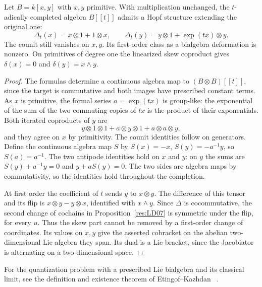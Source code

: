 \begin{theorem}
\label{res:LD08}
Let \(B=k[x,y]\) with \(x,y\) primitive. With multiplication
unchanged, the \(t\)-adically completed algebra \(B[[t]]\)
admits a Hopf structure extending the original one:
\[
 \Delta_t(x)=x\otimes1+1\otimes x,\qquad
 \Delta_t(y)=y\otimes1+\exp(tx)\otimes y .
\]
The counit still vanishes on \(x,y\). Its first-order class
as a bialgebra deformation is nonzero. On primitives of
degree one the linearized skew coproduct gives
\(\delta(x)=0\) and \(\delta(y)=x\wedge y\).
\end{theorem}
\begin{proof}
The formulas determine a continuous algebra map to
\((B\otimes B)[[t]]\), since the target is commutative and
both images have prescribed constant terms. As \(x\) is
primitive, the formal series \(a=\exp(tx)\) is group-like:
the exponential of the sum of the two commuting copies of
\(tx\) is the product of their exponentials.
Both iterated coproducts of \(y\) are
\[
 y\otimes1\otimes1+a\otimes y\otimes1+a\otimes a\otimes y,
\]
and they agree on \(x\) by primitivity. The counit
identities follow on generators. Define the continuous algebra
map \(S\) by \(S(x)=-x\), \(S(y)=-a^{-1}y\), so \(S(a)=a^{-1}\).
The two antipode identities hold on \(x\) and \(y\):
on \(y\) the sums are \(S(y)+a^{-1}y=0\) and
\(y+aS(y)=0\). The two sides are algebra maps by commutativity,
so the identities hold throughout the completion.

At first order the coefficient of \(t\) sends \(y\) to
\(x\otimes y\). The difference of this tensor and its flip
is \(x\otimes y-y\otimes x\), identified with \(x\wedge y\).
Since
\(\Delta\) is cocommutative, the second change of cochains
in Proposition~\ref{res:LD07} is symmetric under the flip,
for every \(u\). Thus the skew part cannot be removed by
a first-order change of coordinates. Its values on \(x,y\)
give the asserted cobracket on the abelian two-dimensional
Lie algebra they span. Its dual is a Lie bracket, since the
Jacobiator is alternating on a two-dimensional space.
\end{proof}

For the quantization problem with a prescribed Lie bialgebra
and its classical limit, see the definition and existence
theorem of Etingof--Kazhdan
~\cite[Section 3 and Theorem 9.6]{etingof-kazhdan}.
